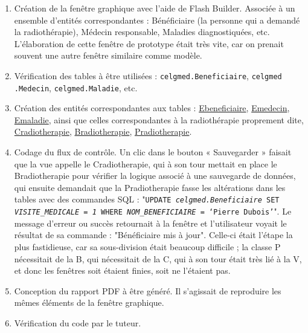 \begin{enumerate}
\item Création de la fenêtre graphique avec l'aide de Flash Builder. Associée à un ensemble d'entités correspondantes : Bénéficiaire (la personne qui a demandé la radiothérapie), Médecin responsable, Maladies diagnostiquées, etc. L'élaboration de cette fenêtre de prototype était très vite, car on prenait souvent une autre fenêtre similaire comme modèle.
\item Vérification des tables à être utilisées : \texttt{celgmed.Beneficiaire}, \texttt{celgmed} \texttt{.Medecin}, \texttt{celgmed.Maladie}, etc.
\item Création des entités correspondantes aux tables : \underline{Ebeneficiaire}, \underline{Emedecin}, \underline{Emaladie}, ainsi que celles correspondantes à la radiothérapie proprement dite, \underline{Cradiotherapie}, \underline{Bradiotherapie}, \underline{Pradiotherapie}. 
\item Codage du flux de contrôle. Un clic dans le bouton « Sauvegarder » faisait que la vue appelle le Cradiotherapie, qui à son tour mettait en place le Bradiotherapie pour vérifier la logique associé à une sauvegarde de données, qui ensuite demandait que la Pradiotherapie fasse les altérations dans les tables avec des commandes SQL : "\texttt{UPDATE \textit{celgmed.Beneficiaire} SET \textit{VISITE\_MEDICALE} = \textit{1} WHERE \textit{NOM\_BENEFICIAIRE} = `\textit{Pierre \\ Dubois}'}". Le message d'erreur ou succès retournait à la fenêtre et l'utilisateur voyait le résultat de sa commande : "Bénéficiaire mis à jour". Celle-ci était l'étape la plus fastidieuse, car sa sous-division était beaucoup difficile ; la classe P nécessitait de la B, qui nécessitait de la C, qui à son tour était très lié à la V, et donc les fenêtres soit étaient finies, soit ne l'étaient pas.
\item Conception du rapport PDF à être généré. Il s'agissait de reproduire les mêmes éléments de la fenêtre graphique.
\item Vérification du code par le tuteur.
\end{enumerate}

